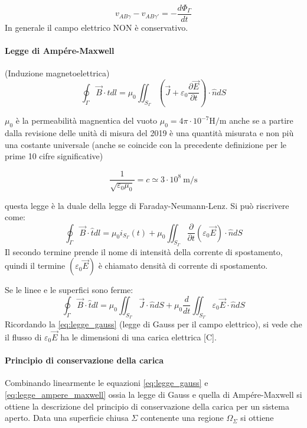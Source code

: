$$
v_{AB\gamma} - v_{AB\gamma'} = -\frac{d\Phi_\Gamma}{dt}
$$
In generale il campo elettrico NON è conservativo.

\paragraph{Legge di Ampére-Maxwell} (Induzione magnetoelettrica)
\begin{equation}
\label{eq:legge_ampere_maxwell}
\oint_\Gamma \vec{B}\cdot\hat{t} dl = \mu_0 \iint_{S_\Gamma} \left(\vec{J} + \varepsilon_0\frac{\partial\vec{E}}{\partial t}\right)\cdot \hat{n} dS
\end{equation}

$\mu_0$ è la permeabilità magnentica del vuoto $\mu_0 = 4\pi\cdot10^{-7}\si{\henry\per\meter} $
anche se a partire dalla revisione delle unità di misura del 2019 è una quantità misurata e non più una costante universale (anche se coincide con la precedente definizione per le prime 10 cifre significative)

$$
\frac{1}{\sqrt{\varepsilon_0\mu_0}} = c \simeq 3\cdot10^{8}\ \si{\meter\per\second}
$$

questa legge è la duale della legge di Faraday-Neumann-Lenz. Si può riscrivere come:
$$
\oint_\Gamma\vec{B}\cdot\hat{t}dl = \mu_0 i_{S_\Gamma}(t) + \mu_0 \iint_{S_\Gamma} \frac{\partial}{\partial t}(\varepsilon_0 \vec{E})\cdot\hat{n}dS
$$
Il secondo termine prende il nome di intensità della corrente di spostamento, quindi il termine
$\left(\varepsilon_0 \vec{E}\right)$ è chiamato densità di corrente di spostamento.

Se le linee e le superfici sono ferme:
$$
\oint_\Gamma\vec{B}\cdot\hat{t}dl = \mu_0\iint_{S_\Gamma}\vec{J}\cdot\hat{n}dS + 
\mu_0\frac{d}{dt}\iint_{S_\Gamma} \varepsilon_0 \vec{E}\cdot\hat{n} dS
$$
Ricordando la \ref{eq:legge_gauss} (legge di Gauss per il campo elettrico), 
si vede che il flusso di $\varepsilon_0\vec{E}$ ha le dimensioni di una carica elettrica 
[\si{\coulomb}].


\paragraph{Principio di conservazione della carica}
Combinando linearmente le equazioni \ref{eq:legge_gauss} e \ref{eq:legge_ampere_maxwell} ossia 
la legge di Gauss e quella di Ampére-Maxwell si ottiene la descrizione del principio di conservazione
della carica per un sistema aperto.
Data una superficie chiusa $\Sigma$ contenente una regione $\Omega_\Sigma$ si ottiene

